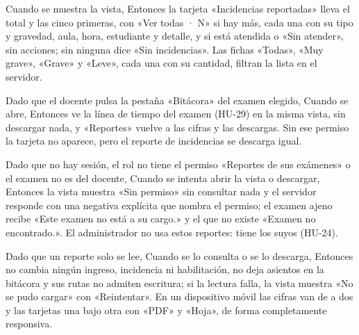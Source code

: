 {      Cuando se muestra la vista, Entonces la tarjeta «Incidencias reportadas» lleva el
      total y las cinco primeras, con «Ver todas · N» si hay más, cada una con su tipo y
      gravedad, aula, hora, estudiante y detalle, y si está atendida o «Sin atender»,
      sin acciones; sin ninguna dice «Sin incidencias». Las fichas «Todas», «Muy
      grave», «Grave» y «Leve», cada una con su cantidad, filtran la lista en el
      servidor.
\item Dado que el docente pulsa la pestaña «Bitácora» del examen elegido, Cuando se
      abre, Entonces ve la línea de tiempo del examen (HU-29) en la misma vista, sin
      descargar nada, y «Reportes» vuelve a las cifras y las descargas. Sin ese permiso la tarjeta no
      aparece, pero el reporte de incidencias se descarga igual.
\item Dado que no hay sesión, el rol no tiene el permiso «Reportes de sus exámenes» o el
      examen no es del docente, Cuando se intenta abrir la vista o descargar, Entonces
      la vista muestra «Sin permiso» sin consultar nada y el servidor responde con una
      negativa explícita que nombra el permiso; el examen ajeno recibe «Este examen no
      está a su cargo.» y el que no existe «Examen no encontrado.». El administrador no
      usa estos reportes: tiene los suyos (HU-24).
\item Dado que un reporte solo se lee, Cuando se lo consulta o se lo descarga, Entonces
      no cambia ningún ingreso, incidencia ni habilitación, no deja asientos en la
      bitácora y sus rutas no admiten escritura; si la lectura falla, la vista muestra
      «No se pudo cargar» con «Reintentar». En un dispositivo móvil las cifras van de a
      dos y las tarjetas una bajo otra con «PDF» y «Hoja», de forma completamente
      responsiva.}

\def\HUMockupsPares{%
\CajaMockup{hu23-reportes-del-examen}{10.6cm} & \CajaMockup{hu23-reportes-del-examen-movil}{3.2cm} \\[4pt]
\hline}


